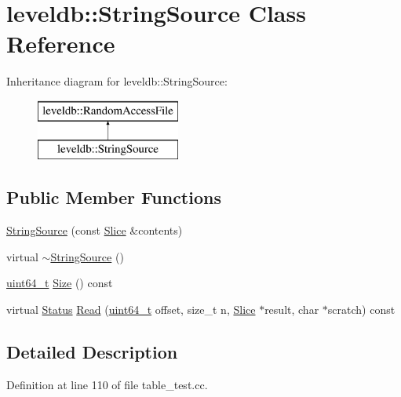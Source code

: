 \hypertarget{classleveldb_1_1_string_source}{}\section{leveldb\+:\+:String\+Source Class Reference}
\label{classleveldb_1_1_string_source}
Inheritance diagram for leveldb\+:\+:String\+Source\+:\begin{figure}[H]
\begin{center}
\leavevmode
\includegraphics[height=2.000000cm]{classleveldb_1_1_string_source}
\end{center}
\end{figure}
\subsection*{Public Member Functions}
\begin{DoxyCompactItemize}
\item 
\hyperlink{classleveldb_1_1_string_source_a4f85ccda6f37775d790834de05284fda}{String\+Source} (const \hyperlink{classleveldb_1_1_slice}{Slice} \&contents)
\item 
virtual \hyperlink{classleveldb_1_1_string_source_a0d468686fe633d0cbb04ec58be474cc8}{$\sim$\+String\+Source} ()
\item 
\hyperlink{stdint_8h_aaa5d1cd013383c889537491c3cfd9aad}{uint64\+\_\+t} \hyperlink{classleveldb_1_1_string_source_af31de6d789ba2427c98673fd1eae0778}{Size} () const 
\item 
virtual \hyperlink{classleveldb_1_1_status}{Status} \hyperlink{classleveldb_1_1_string_source_a7cf8d6ee4cd01cf514ce68326e6ec3c2}{Read} (\hyperlink{stdint_8h_aaa5d1cd013383c889537491c3cfd9aad}{uint64\+\_\+t} offset, size\+\_\+t n, \hyperlink{classleveldb_1_1_slice}{Slice} $\ast$result, char $\ast$scratch) const 
\end{DoxyCompactItemize}


\subsection{Detailed Description}


Definition at line 110 of file table\+\_\+test.\+cc.



